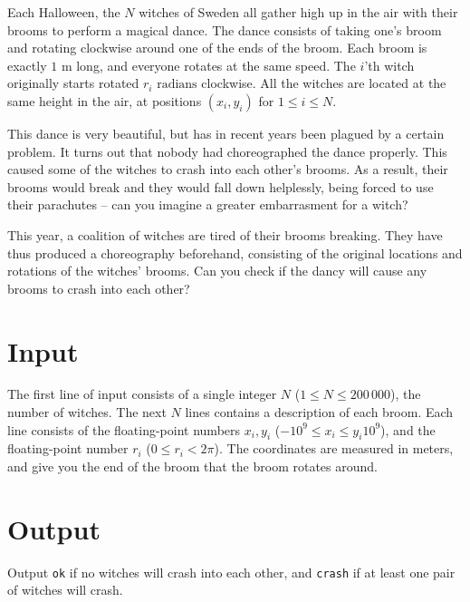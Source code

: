 
\noindent
Each Halloween, the $N$ witches of Sweden all gather high up in the air with their brooms to perform a magical dance.
The dance consists of taking one's broom and rotating clockwise around one of the ends of the broom.
Each broom is exactly $1\text{ m}$ long, and everyone rotates at the same speed.
The $i$'th witch originally starts rotated $r_i\text{ radians}$ clockwise.
All the witches are located at the same height in the air, at positions $(x_i, y_i)$ for $1 \le i \le N$.

This dance is very beautiful, but has in recent years been plagued by a certain problem.
It turns out that nobody had choreographed the dance properly.
This caused some of the witches to crash into each other's brooms.
As a result, their brooms would break and they would fall down helplessly, being forced to use their parachutes -- can you imagine a greater embarrasment for a witch?

This year, a coalition of witches are tired of their brooms breaking.
They have thus produced a choreography beforehand, consisting of the original locations and rotations of the witches' brooms.
Can you check if the dancy will cause any brooms to crash into each other?

\section*{Input}
The first line of input consists of a single integer $N$ ($1 \le N \le 200\,000$), the number of witches.
The next $N$ lines contains a description of each broom.
Each line consists of the floating-point numbers $x_i, y_i$ ($-10^{9} \le x_i \le y_i 10^{9}$), and the floating-point number $r_i$ ($0 \le r_i < 2\pi$).
The coordinates are measured in meters, and give you the end of the broom that the broom rotates around.

\section*{Output}
Output \texttt{ok} if no witches will crash into each other, and \texttt{crash} if at least one pair of witches will crash.
